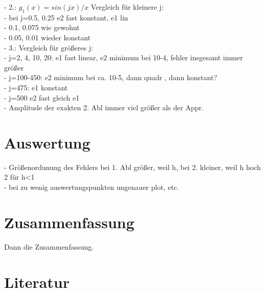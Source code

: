 \documentclass{scrartcl}
\begin{document}
- 2.: $g_1(x)=sin(jx)/x$  Vergleich für kleinere j: \\
- bei j=0.5, 0.25 e2 fast konstant, e1 lin\\
- 0.1, 0.075 wie gewohnt\\
- 0.05, 0.01 wieder konstant\\
- 3.: Vergleich für größeres j:\\
- j=2, 4, 10, 20: e1 fast linear, e2 minimum bei 10-4, fehler insgesamt immer größer\\
- j=100-450: e2 minimum bei ca. 10-5, dann quadr , dann konstant?\\
- j=475: e1 konstant\\
- j=500 e2 fast gleich e1\\

- Amplitude der exakten 2. Abl immer viel größer als der Appr.

\pagebreak \section{Auswertung}
\label{sec:auswertung}
- Größenordunung des Fehlers bei 1. Abl größer, weil h, bei 2. kleiner, weil h hoch 2 für h<1\\
- bei zu wenig auswertungspunkten ungenauer plot, etc.\\

\pagebreak \section{Zusammenfassung}
\label{sec:zusammenfassung}
Dann die Zusammenfassung.

\pagebreak \section{Literatur}
\label{sec:literatur}
\end{document}
